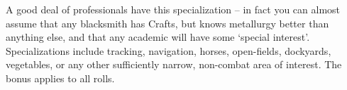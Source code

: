 \begin{multicols}{2}
{  A good deal of professionals have this specialization -- in fact you can almost assume that any blacksmith has Crafts, but knows metallurgy better than anything else, and that any academic will have some `special interest'.
}{
  Specializations include tracking, navigation, horses, open-fields, dockyards, vegetables, or any other sufficiently narrow, non-combat area of interest.
  The bonus applies to all rolls.
}

\end{multicols}
